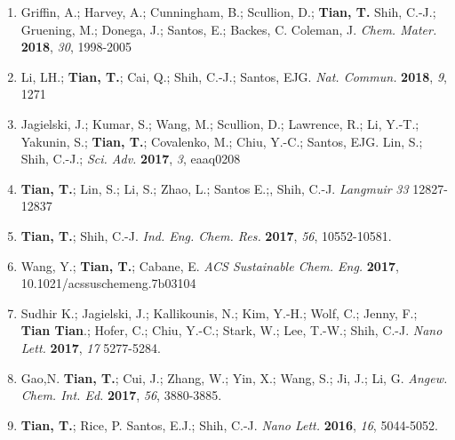 \documentclass[margin]{res}
\begin{document}
\begin{resume}
\begin{enumerate}
  
\item Griffin, A.; Harvey, A.; Cunningham, B.; Scullion, D.;
  \textbf{Tian, T.} Shih, C.-J.; Gruening, M.; Donega, J.; Santos, E.;
  Backes, C. Coleman, J. \textit{Chem. Mater.} \textbf{2018},
  \textit{30}, 1998-2005
\item Li, LH.; \textbf{Tian, T.}; Cai, Q.; Shih, C.-J.; Santos,
  EJG. \textit{Nat. Commun.} \textbf{2018}, \textit{9}, 1271
\item Jagielski, J.; Kumar, S.; Wang, M.; Scullion, D.; Lawrence, R.;
  Li, Y.-T.; Yakunin, S.; \textbf{Tian, T.}; Covalenko, M.; Chiu,
  Y.-C.; Santos, EJG. Lin, S.; Shih, C.-J.; \textit{Sci. Adv.}
  \textbf{2017}, \textit{3}, eaaq0208

  \item \textbf{Tian, T.}; Lin, S.; Li, S.; Zhao, L.; Santos E.;,
    Shih, C.-J. \textit{Langmuir} \textit{33} 12827-12837
  \item \textbf{Tian, T.}; Shih, C.-J. \textit{Ind. Eng. Chem. Res.}
    \textbf{2017}, \textit{56}, 10552-10581.
  
  
  
  \item Wang, Y.; \textbf{Tian, T.}; Cabane, E. \textit{ACS
      Sustainable Chem. Eng.} \textbf{2017},
    10.1021/acssuschemeng.7b03104
  \item Sudhir K.; Jagielski, J.; Kallikounis, N.; Kim, Y.-H.; Wolf,
    C.; Jenny, F.; \textbf{Tian Tian}.; Hofer, C.; Chiu, Y.-C.; Stark,
    W.; Lee, T.-W.; Shih, C.-J. \textit{Nano Lett.} \textbf{2017},
    \textit{17} 5277-5284.
  \item Gao,N. \textbf{Tian, T.}; Cui, J.; Zhang, W.; Yin, X.; Wang,
    S.; Ji, J.; Li, G. \textit{Angew. Chem. Int. Ed.} \textbf{2017},
    \textit{56}, 3880-3885.
    \item \textbf{Tian, T.}; Rice, P. Santos, E.J.; Shih,
    C.-J. \textit{Nano Lett.} \textbf{2016}, \textit{16}, 5044-5052.
    

\end{enumerate}
\end{resume}
\end{document}
